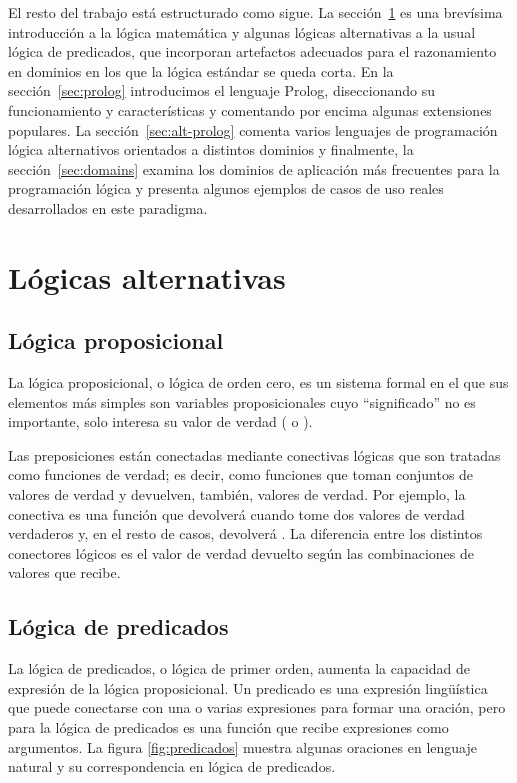 \documentclass[11pt,captions=nooneline,DIV=14, parskip=full]{scrartcl}
\begin{document}
El resto del trabajo está estructurado como sigue. La sección~\ref{sec:alt-logic} es una brevísima introducción a la lógica matemática y algunas lógicas alternativas a la usual lógica de predicados, que incorporan artefactos adecuados para el razonamiento en dominios en los que la lógica estándar se queda corta. En la sección~\ref{sec:prolog} introducimos el lenguaje Prolog, diseccionando su funcionamiento y características y comentando por encima algunas extensiones populares. La sección~\ref{sec:alt-prolog} comenta varios lenguajes de programación lógica alternativos orientados a distintos dominios y finalmente, la sección~\ref{sec:domains} examina los dominios de aplicación más frecuentes para la programación lógica y presenta algunos ejemplos de casos de uso reales desarrollados en este paradigma.

\section{Lógicas alternativas}
\label{sec:alt-logic}
\subsection{Lógica proposicional}

La lógica proposicional, o lógica de orden cero, es un sistema formal en el que sus elementos más simples son variables proposicionales cuyo ``significado'' no es importante, solo interesa su valor de verdad ( o ).

Las preposiciones están conectadas mediante conectivas lógicas que son tratadas como funciones de verdad; es decir, como funciones que toman conjuntos de valores de verdad y devuelven, también, valores de verdad. Por ejemplo, la conectiva  es una función que devolverá  cuando tome dos valores de verdad verdaderos y, en el resto de casos, devolverá . La diferencia entre los distintos conectores lógicos es el valor de verdad devuelto según las combinaciones de valores que recibe.

\subsection{Lógica de predicados}

La lógica de predicados, o lógica de primer orden, aumenta la capacidad de expresión de la lógica proposicional. Un predicado es una expresión lingüística que puede conectarse con una o varias expresiones para formar una oración, pero para la lógica de predicados es una función que recibe expresiones como argumentos. La figura \ref{fig:predicados} muestra algunas oraciones en lenguaje natural y su correspondencia en lógica de predicados.
\end{document}
